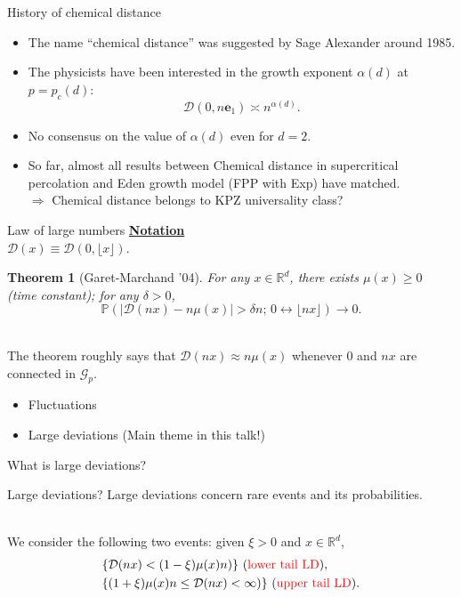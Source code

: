 \documentclass[10pt]{beamer}
\newtheorem{thm}{Theorem}
\newcommand{\R}{\mathbb{R}}
\renewcommand{\P}{\mathbb{P
}}
\newcommand{\kG}{\mathcal{G}}
\newcommand{\kD}{\mathcal{D}}
\begin{document}
\begin{frame}{History of chemical distance}
  \begin{itemize}
    \item The name ``chemical distance'' was suggested by Sage Alexander around 1985.
    \item The physicists have been interested in the growth exponent $\alpha(d)$ at $p=p_c(d)$:
      $$\kD(0,n\mathbf{e}_1)\asymp n^{\alpha(d)}.$$
    \item No consensus on the value of $\alpha(d)$ even for $d=2$. 
    \item So far, almost all results between {\color{red}Chemical distance in supercritical percolation} and {\color{blue}Eden growth model (FPP with Exp)} have matched.\\

      \vspace{2mm}
      $\Rightarrow$ {\color{red}Chemical distance} belongs to KPZ universality class?
    \end{itemize}
  \end{frame}
\begin{frame}{Law of large numbers}
 \underline{\bf Notation}\\
    \vspace{2mm}
    $\kD(x)\equiv \kD(0,\lfloor x\rfloor).$\\
\begin{thm}[Garet-Marchand '04]
  For any $x\in \R^d$, there exists $\mu(x)\geq 0$ ({\color{red}time constant}); for any $\delta>0$,
$$\P(|\kD(nx)-n\mu(x)|>\delta n;\,0\leftrightarrow \lfloor nx\rfloor)\to 0.$$
\end{thm}
~\\
The theorem roughly says that $\kD(nx)\approx n\mu(x)$ whenever $0$ and $nx$ are connected in $\kG_p.$\\
\vspace{5mm}
\begin{itemize}
\item Fluctuations
  \item Large deviations ({\color{red}Main theme in this talk!})
  \end{itemize}
\end{frame}

\begin{frame}{What is large deviations?}
    \begin{itembox}[t]{Large deviations?}
    Large deviations concern rare events and its probabilities.
    \end{itembox}
    ~\\
    \vspace{4mm}
We consider the following two events: given $\xi>0$ and $x\in \mathbb R^d$,
    \begin{align*}
& \{\kD(nx)<(1-\xi)\mu(x)n)\} \text{ ({\color{red}lower tail LD})},\\
   &    \{(1+\xi)\mu(x)n\leq \kD(nx)<\infty)\} \text{ ({\color{red} upper tail LD})}.
      \end{align*}
\end{frame}
\end{document}

